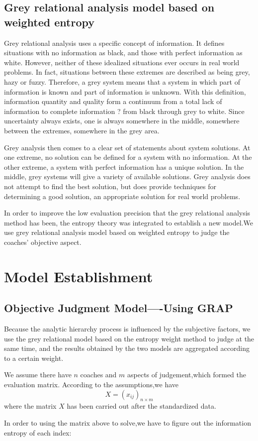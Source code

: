 \documentclass{mcmthesis}
\begin{document}
\subsection{Grey relational analysis model based on weighted entropy}

\par Grey relational analysis uses a specific concept of information. It defines situations with no information as black, and those with perfect information as white. However, neither of these idealized situations ever occurs in real world problems. In fact, situations between these extremes are described as being grey, hazy or fuzzy. Therefore, a grey system means that a system in which part of information is known and part of information is unknown. With this definition, information quantity and quality form a continuum from a total lack of information to complete information ? from black through grey to white. Since uncertainty always exists, one is always somewhere in the middle, somewhere between the extremes, somewhere in the grey area.
\par Grey analysis then comes to a clear set of statements about system solutions. At one extreme, no solution can be defined for a system with no information. At the other extreme, a system with perfect information has a unique solution. In the middle, grey systems will give a variety of available solutions. Grey analysis does not attempt to find the best solution, but does provide techniques for determining a good solution, an appropriate solution for real world problems.

\par In order to improve the low evaluation precision that the grey relational analysis method has been, the entropy theory was integrated to establish a new model.We use grey relational analysis model based on weighted entropy to judge the coaches' objective aspect.

\section{Model Establishment} 

\subsection{Objective Judgment Model----Using GRAP}
\par Because the analytic hierarchy process is influenced by the subjective factors, we use the grey relational model based on the entropy weight method to judge at the same time, and the results obtained by the two models are aggregated according to a certain weight.
\par We assume there have $n$ coaches and $m$ aspects of judgement,which formed the evaluation matrix. According to the assumptions,we have
\begin{equation}
X={({x}_{ij})}_{n\times m}
\end{equation}
where the matrix $X$ has been carried out after the standardized data.
\par In order to using the matrix above to solve,we have to figure out the information entropy of each index:
\end{document}
